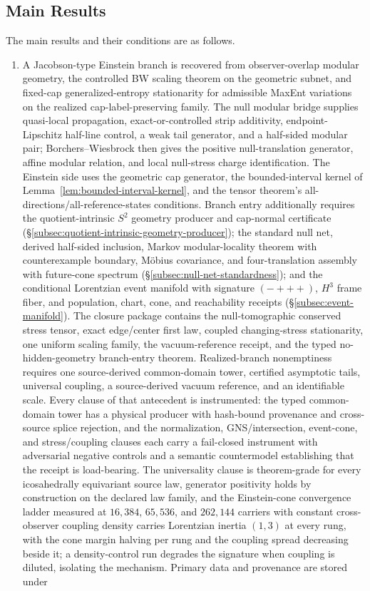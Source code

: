 \documentclass[11pt]{article}
\begin{document}
\subsection*{Main Results}

The main results and their conditions are as follows.

\begin{enumerate}[leftmargin=2em]
\item A Jacobson-type Einstein branch is recovered from observer-overlap modular geometry, the controlled BW scaling theorem on the geometric subnet, and fixed-cap generalized-entropy stationarity for admissible MaxEnt variations on the realized cap-label-preserving family. The null modular bridge supplies quasi-local propagation, exact-or-controlled strip additivity, endpoint-Lipschitz half-line control, a weak tail generator, and a half-sided modular pair; Borchers--Wiesbrock then gives the positive null-translation generator, affine modular relation, and local null-stress charge identification. The Einstein side uses the geometric cap generator, the bounded-interval kernel of Lemma~\ref{lem:bounded-interval-kernel}, and the tensor theorem's all-directions/all-reference-states conditions. Branch entry additionally requires the quotient-intrinsic \(S^2\) geometry producer and cap-normal certificate (\S\ref{subsec:quotient-intrinsic-geometry-producer}); the standard null net, derived half-sided inclusion, Markov modular-locality theorem with counterexample boundary, M\"obius covariance, and four-translation assembly with future-cone spectrum (\S\ref{subsec:null-net-standardness}); and the conditional Lorentzian event manifold with signature \((-{+}{+}{+})\), \(H^3\) frame fiber, and population, chart, cone, and reachability receipts (\S\ref{subsec:event-manifold}). The closure package contains the null-tomographic conserved stress tensor, exact edge/center first law, coupled changing-stress stationarity, one uniform scaling family, the vacuum-reference receipt, and the typed no-hidden-geometry branch-entry theorem. Realized-branch nonemptiness requires one source-derived common-domain tower, certified asymptotic tails, universal coupling, a source-derived vacuum reference, and an identifiable scale. Every clause of that antecedent is instrumented: the typed common-domain tower has a physical producer with hash-bound provenance and cross-source splice rejection, and the normalization, GNS/intersection, event-cone, and stress/coupling clauses each carry a fail-closed instrument with adversarial negative controls and a semantic countermodel establishing that the receipt is load-bearing. The universality clause is theorem-grade for every icosahedrally equivariant source law, generator positivity holds by construction on the declared law family, and the Einstein-cone convergence ladder measured at \(16{,}384\), \(65{,}536\), and \(262{,}144\) carriers with constant cross-observer coupling density carries Lorentzian inertia \((1,3)\) at every rung, with the cone margin halving per rung and the coupling spread decreasing beside it; a density-control run degrades the signature when coupling is diluted, isolating the mechanism. Primary data and provenance are stored under 
\end{enumerate}
\end{document}

